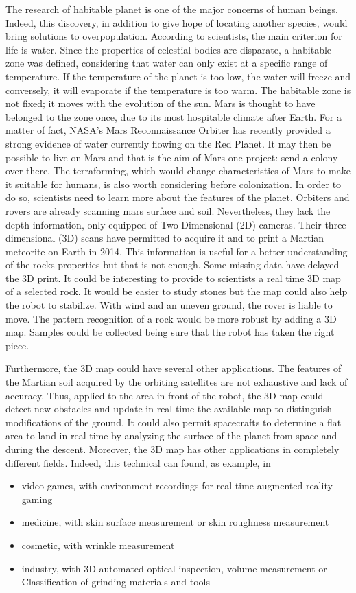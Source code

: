 The research of habitable planet is one of the major concerns of human beings. Indeed, this discovery, in addition to give hope of locating another species, would bring solutions to overpopulation. According to scientists, the main criterion for life is water. Since the properties of celestial bodies are disparate, a habitable zone was defined, considering that water can only exist at a specific range of temperature. If the temperature of the planet is too low, the water will freeze and conversely, it will evaporate if the temperature is too warm. The habitable zone is not fixed; it moves with the evolution of the sun. Mars is thought to have belonged to the zone once, due to its most hospitable climate after Earth. For a matter of fact, NASA's Mars Reconnaissance Orbiter has recently provided a strong evidence of water currently flowing on the Red Planet. It may then be possible to live on Mars and that is the aim of Mars one project: send a colony over there. The terraforming, which would change characteristics of Mars to make it suitable for humans, is also worth considering before colonization. In order to do so, scientists need to learn more about the features of the planet. Orbiters and rovers are already scanning mars surface and soil. Nevertheless, they lack the depth information, only equipped of Two Dimensional (2D) cameras. Their three dimensional (3D) scans have permitted to acquire it and to print a Martian meteorite on Earth in 2014. This information is useful for a better understanding of the rocks properties but that is not enough. Some missing data have delayed the 3D print. It could be interesting to provide to scientists a real time 3D map of a selected rock. It would be easier to study stones but the map could also help the robot to stabilize. With wind and an uneven ground, the rover is liable to move. The pattern recognition of a rock would be more robust by adding a 3D map. Samples could be collected being sure that the robot has taken the right piece. 

Furthermore, the 3D map could have several other applications. The features of the Martian soil acquired by the orbiting satellites are not exhaustive and lack of accuracy. Thus, applied to the area in front of the robot, the 3D map could detect new obstacles and update in real time the available map to distinguish modifications of the ground. It could also permit spacecrafts to determine a flat area to land in real time by analyzing the surface of the planet from space and during the descent. Moreover, the 3D map has other applications in completely different fields. Indeed, this technical can found, as example, in
\begin{itemize}
\item video games, with environment recordings for real time augmented reality gaming
\item medicine, with skin surface measurement or skin roughness measurement
\item cosmetic, with wrinkle measurement
\item industry, with 3D-automated optical inspection, volume measurement or Classification of grinding materials and tools
\end{itemize}

